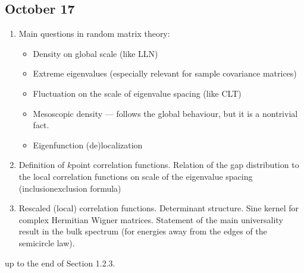 \documentclass[letterpaper,10pt,english]{sphinxhowto}
\begin{document}
\subsection{October 17}
\label{\detokenize{teaching/random_matrices_2017:october-17}}\begin{enumerate}
%
\item {} 
\sphinxAtStartPar
Main questions in random matrix theory:
\begin{itemize}
\item {} 
\sphinxAtStartPar
Density on global scale (like LLN)

\item {} 
\sphinxAtStartPar
Extreme eigenvalues (especially relevant for sample covariance matrices)

\item {} 
\sphinxAtStartPar
Fluctuation on the scale of eigenvalue spacing (like CLT)

\item {} 
\sphinxAtStartPar
Mesoscopic density — follows the global behaviour, but it is a non\sphinxhyphen{}trivial fact.

\item {} 
\sphinxAtStartPar
Eigenfunction (de)localization

\end{itemize}

\item {} 
\sphinxAtStartPar
Definition of \(k\)\sphinxhyphen{}point correlation functions. Relation of the gap distribution to the local correlation functions on scale of the eigenvalue spacing (inclusion\sphinxhyphen{}exclusion formula)

\item {} 
\sphinxAtStartPar
Rescaled (local) correlation functions. Determinant structure. Sine kernel for complex Hermitian Wigner matrices. Statement of the main universality result in the bulk spectrum (for energies away from the edges of the semicircle law).

\end{enumerate}

\sphinxAtStartPar
{}  up to the end of Section 1.2.3.
\end{document}
